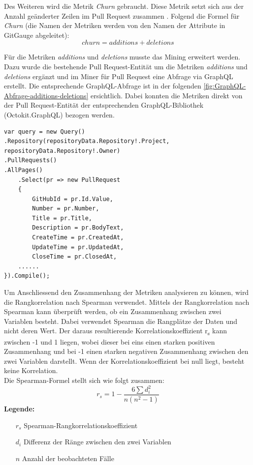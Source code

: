 Des Weiteren wird die Metrik \textit{Churn} gebraucht. Diese Metrik setzt sich aus der Anzahl geänderter Zeilen im Pull Request zusammen \parencite{gousios_exploratory_2014}. Folgend die Formel für \textit{Churn} (die Namen der Metriken werden von den Namen der Attribute in GitGauge abgeleitet): 
\begin{equation}
churn = additions + deletions
\end{equation}

Für die Metriken \textit{additions} und \textit{deletions} musste das Mining erweitert werden. Dazu wurde die bestehende Pull Request-Entität um die Metriken \textit{additions} und \textit{deletions} ergänzt und im Miner für Pull Request eine Abfrage via GraphQL erstellt. Die entsprechende GraphQL-Abfrage ist in der folgenden \autoref{fig:GraphQL-Abfrage-additions-deletions} ersichtlich. Dabei konnten die Metriken direkt von der Pull Request-Entität der entsprechenden GraphQL-Bibliothek (Octokit.GraphQL) bezogen werden.

\begin{lstlisting}[language=CSharp, caption={GraphQL-Abfrage additions und deletions}]
var query = new Query()
.Repository(repositoryData.Repository!.Project, repositoryData.Repository!.Owner)
.PullRequests()
.AllPages()
    .Select(pr => new PullRequest
    {
        GitHubId = pr.Id.Value,
        Number = pr.Number,
        Title = pr.Title,
        Description = pr.BodyText,
        CreateTime = pr.CreatedAt,
        UpdateTime = pr.UpdatedAt,
        CloseTime = pr.ClosedAt,
    ......
}).Compile();
\end{lstlisting}

Um Anschliessend den Zusammenhang der Metriken analysieren zu können, wird die Rangkorrelation nach Spearman verwendet. Mittels der Rangkorrelation nach Spearman \parencite{noauthor_t-test_nodate} kann überprüft werden, ob ein Zusammenhang zwischen zwei Variablen besteht. Dabei verwendet Spearman die Rangplätze der Daten und nicht deren Wert. Der daraus resultierende Korrelationskoeffizient r\textsubscript{s} kann zwischen -1 und 1 liegen, wobei dieser bei eins einen starken positiven Zusammenhang und bei -1 einen starken negativen Zusammenhang zwischen den zwei Variablen darstellt. Wenn der Korrelationskoeffizient bei null liegt, besteht keine Korrelation. \parencite{noauthor_t-test_nodate}  \\
Die Spearman-Formel \parencite{noauthor_t-test_nodate} stellt sich wie folgt zusammen: 
\begin{equation}
r_s = 1 - \frac{6 \sum d_i^2}{n(n^2 - 1)}
\end{equation}
\label{eqn:spearman}
\noindent\textbf{Legende:}
\begin{itemize}
  \item [$r_s$] Spearman-Rangkorrelationskoeffizient
  \item[$d_i$] Differenz der Ränge zwischen den zwei Variablen 
  \item[$n$] Anzahl der beobachteten Fälle
\end{itemize}

